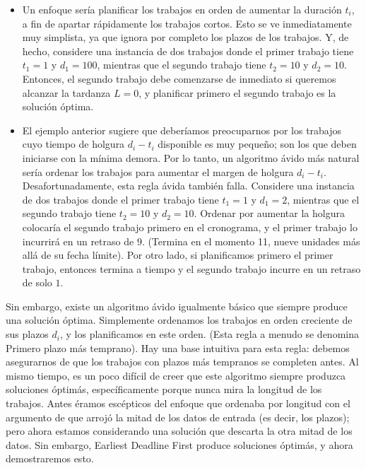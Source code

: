 \documentclass[a4paper, 12pt]{book}
\theoremstyle{dotless}
\begin{document}
\begin{itemize}
\item Un enfoque sería planificar los trabajos en orden de aumentar la duración $t_i$, a fin de apartar rápidamente los trabajos cortos. Esto se ve inmediatamente muy simplista, ya que ignora por completo los plazos de los trabajos. Y, de hecho, considere una instancia de dos trabajos donde el primer trabajo tiene $t_1 = 1$ y $d_1 = 100$, mientras que el segundo trabajo tiene $t_2 = 10$ y $d_2 = 10$. Entonces, el segundo trabajo debe comenzarse de inmediato si queremos alcanzar la tardanza $L=0$, y planificar primero el segundo trabajo es la solución óptima.\\
\end{itemize}

\begin{itemize}
\item El ejemplo anterior sugiere que deberíamos preocuparnos por los trabajos cuyo tiempo de holgura $d_i-t_i$ disponible es muy pequeño; son los que deben iniciarse con la mínima demora. Por lo tanto, un algoritmo ávido más natural sería ordenar los trabajos para aumentar el margen de holgura  $d_i-t_i$. Desafortunadamente, esta regla ávida también falla. Considere una instancia de dos trabajos donde el primer trabajo tiene $t_1 = 1$ y $d_1 = 2$, mientras que el segundo trabajo tiene $t_2 = 10$ y $d_2 = 10$. Ordenar por aumentar la holgura colocaría el segundo trabajo primero en el cronograma, y el primer trabajo lo incurrirá en un retraso de $9$. (Termina en el momento 11, nueve unidades más allá de su fecha límite). Por otro lado, si planificamos primero el primer trabajo, entonces termina a tiempo y el segundo trabajo incurre en un retraso de solo $1$.\\
\end{itemize}


Sin embargo, existe un algoritmo ávido igualmente básico que siempre produce una solución óptima. Simplemente ordenamos los trabajos en orden creciente de sus plazos $d_i$, y los planificamos en este orden. (Esta regla a menudo se denomina Primero plazo más temprano). Hay una base intuitiva para esta regla: debemos asegurarnos de que los trabajos con plazos más tempranos se completen antes. Al mismo tiempo, es un poco difícil de creer que este algoritmo siempre produzca soluciones óptimás, específicamente porque nunca mira la longitud de los trabajos. Antes éramos escépticos del enfoque que ordenaba por longitud con el argumento de que arrojó la mitad de los datos de entrada (es decir, los plazos); pero ahora estamos considerando una solución que descarta la otra mitad de los datos. Sin embargo, Earliest Deadline First produce soluciones óptimás, y ahora demostraremos esto.\\
\end{document}
